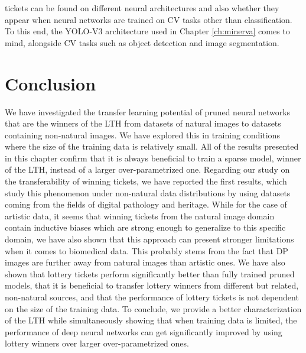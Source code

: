 tickets can be found on different neural architectures and also whether they appear when neural networks are trained on CV tasks other than classification. To this end, the YOLO-V3 architecture used in Chapter \ref{ch:minerva} comes to mind, alongside CV tasks such as object detection and image segmentation.

\section{Conclusion}
\label{sec:conclusion}
We have investigated the transfer learning potential of pruned neural networks that are the winners of the LTH from datasets of natural images to datasets containing non-natural images. We have explored this in training conditions where the size of the training data is relatively small. All of the results presented in this chapter confirm that it is always beneficial to train a sparse model, winner of the LTH, instead of a larger over-parametrized one. Regarding our study on the transferability of winning tickets, we have reported the first results, which study this phenomenon under non-natural data distributions by using datasets coming from the fields of digital pathology and heritage. While for the case of artistic data, it seems that winning tickets from the natural image domain contain inductive biases which are strong enough to generalize to this specific domain, we have also shown that this approach can present stronger limitations when it comes to biomedical data. This probably stems from the fact that DP images are further away from natural images than artistic ones. We have also shown that lottery tickets perform significantly better than fully trained pruned models, that it is beneficial to transfer lottery winners from different but related, non-natural sources, and that the performance of lottery tickets is not dependent on the size of the training data. To conclude, we provide a better characterization of the LTH while simultaneously showing that when training data is limited, the performance of deep neural networks can get significantly improved by using lottery winners over larger over-parametrized ones.
